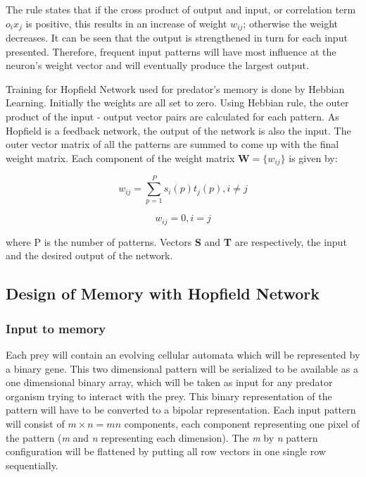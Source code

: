 The rule states that if the cross product of output and input, or correlation term \(o_ix_j\) is positive, this results in an increase of weight \(w_{ij}\); otherwise the weight decreases. It can be seen that the output is strengthened in turn for each input presented. Therefore, frequent input patterns will have most influence at the neuron's weight vector and will eventually produce the largest output.

Training for Hopfield Network used for predator's memory is done by Hebbian Learning. Initially the weights are all set to zero. Using Hebbian rule, the outer product of the input - output vector pairs are calculated for each pattern. As Hopfield is a feedback network, the output of the network is also the input. The outer vector matrix of all the patterns are summed to come up with the final weight matrix. Each component of the weight matrix \(\textbf{W} = \{w_{ij}\}\) is given by:

\begin{equation}
w_{ij} = \sum_{p=1}^{P} s_i(p) t_j(p), i \neq j
\end{equation}

\[
w_{ij} = 0, i = j
\]

where P is the number of patterns. Vectors \textbf{S} and \textbf{T} are respectively, the input and the desired output of the network.

\subsection{Design of Memory with Hopfield Network}

\subsubsection{Input to memory}
Each prey will contain an evolving cellular automata which will be represented by a binary gene. This two dimensional pattern will be serialized to be available as a one dimensional binary array, which will be taken as input for any predator organism trying to interact with the prey. This binary representation of the pattern will have to be converted to a bipolar representation. Each input pattern will consist of \(\textit{m} \times \textit{n} = \textit{mn}\) components, each component representing one pixel of the pattern (\textit{m} and \textit{n} representing each dimension). The \textit{m} by \textit{n} pattern configuration will be flattened by putting all row vectors in one single row sequentially.

